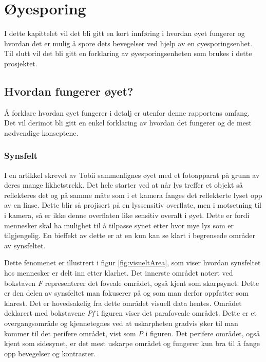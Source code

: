 
\chapter{Øyesporing}

I dette kapittelet vil det bli gitt en kort innføring i hvordan øyet fungerer og hvordan det er mulig å spore dets bevegelser ved hjelp av en øyesporingsenhet. Til slutt vil det bli gitt en forklaring av øyesporingsenheten som brukes i dette prosjektet.

\section{Hvordan fungerer øyet?}

Å forklare hvordan øyet fungerer i detalj er utenfor denne rapportens omfang. Det vil derimot bli gitt en enkel forklaring av hvordan det fungerer og de mest nødvendige konseptene.

\subsection{Synsfelt}

I en artikkel skrevet av Tobii \cite{Calibration} sammenlignes øyet med et fotoapparat på grunn av deres mange likhetstrekk. Det hele starter ved at når lys treffer et objekt så reflekteres det og på samme måte som i et kamera fanges det reflekterte lyset opp av en linse. Dette blir så projisert på en lyssensitiv overflate, men i motsetning til i kamera, så er ikke denne overflaten like sensitiv overalt i øyet. Dette er fordi mennesker skal ha mulighet til å tilpasse synet etter hvor mye lys som er tilgjengelig. En bieffekt av dette er at en kun kan se klart i begrensede områder av synsfeltet. 

Dette fenomenet er illustrert i figur \ref{fig:visueltArea}, som viser hvordan synsfeltet hos mennesker er delt inn etter klarhet. Det innerste området notert ved bokstaven \textit{F} representerer det foveale området, også kjent som skarpsynet. Dette er den delen av synsfeltet man fokuserer på og som man derfor oppfatter som klarest. Det er hovedsakelig fra dette området visuell data hentes. Området deklarert med bokstavene \textit{Pf} i figuren viser det parafoveale området. Dette er et overgangsområde og kjennetegnes ved at uskarpheten gradvis øker til man kommer til det perifere området, vist som \textit{P} i figuren. Det perifere området, også kjent som sidesynet, er det mest uskarpe området og fungerer kun bra til å fange opp bevegelser og kontraster.

